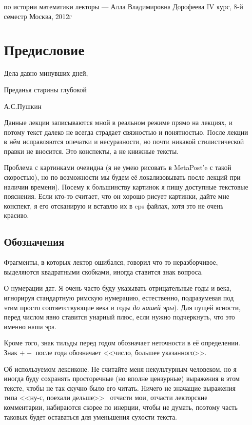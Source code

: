 \documentclass[a4paper,oneside,fleqn,10pt]{article}
\begin{document}
          {по истории математики}
          {лекторы --- Алла Владимировна Дорофеева}
          {IV курс, 8-й семестр}
          {Москва, 2012г}
\section*{Предисловие}
\epigraph{Дела давно минувших дней,
  \par Преданья старины глубокой}{А.С.Пушкин}

Данные лекции записываются мной в реальном режиме прямо на лекциях,
и потому текст далеко не всегда страдает связностью и понятностью.
После лекции в нём исправляются опечатки и несуразности, но почти
никакой стилистической правки не вносится. Это конспекты, а не
книжные тексты.

Проблема с картинками очевидна (я не умею рисовать в MetaPost'e с такой скоростью),
но по возможности мы будем её локализовывать после лекций при наличии времени).
Посему к большинству картинок я пишу доступные текстовые пояснения.
Если кто-то считает, что он хорошо рисует картинки, дайте мне конспект, я его
отсканирую и вставлю их в eps файлах, хотя это не очень красиво.

\subsection*{Обозначения}

Фрагменты, в которых лектор ошибался, говорил что то неразборчивое,
выделяются квадратными скобками, иногда ставится знак вопроса.

О нумерации дат. Я очень часто буду указывать отрицательные годы и века,
игнорируя стандартную римскую нумерацию, естественно, подразумевая под
этим просто соответствующие века и годы \emph{до нашей эры}).
Для пущей ясности, перед числом явно ставится унарный плюс, если нужно подчеркнуть,
что это именно наша эра.

Кроме того, знак тильды перед годом обозначает неточности в её определении.
Знак ${+}{+}$ после года обозначает <<число, большее указанного>>.

Об используемом лексиконе. Не считайте меня некультурным человеком, но я иногда буду
сохранять просторечные (но вполне цензурные) выражения в этом тексте, чтобы не так скучно
было его читать. Ничего не значащие выражения типа <<ну-с, поехали дельше>>~ отчасти
мои, отчасти лекторские комментарии, набираются скорее по инерции, чтобы не думать,
поэтому часть таковых будет оставаться для уменьшения сухости текста.
\end{document}
